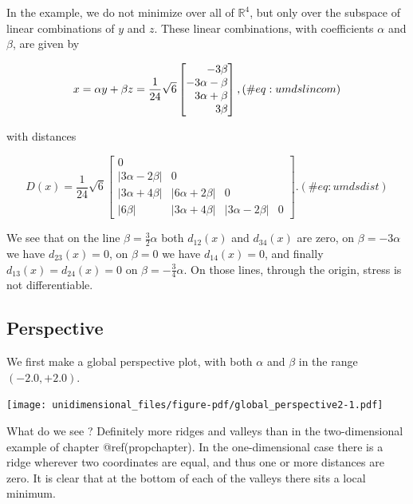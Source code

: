 \documentclass[
  12pt,
  letterpaper,
  DIV=11,
  numbers=noendperiod]{scrreprt}
\theoremstyle{remark}
\begin{document}
In the example, we do not minimize over all of \(\mathbb{R}^4\), but
only over the subspace of linear combinations of \(y\) and \(z\). These
linear combinations, with coefficients \(\alpha\) and \(\beta\), are
given by

\begin{equation}
x=\alpha y+\beta z=\frac{1}{24}\sqrt{6}\begin{bmatrix}\hfill-3\beta\\\hfill-3\alpha-\beta\\
\hfill3\alpha+\beta\\\hfill3\beta\end{bmatrix},
(\#eq:umdslincom)
\end{equation}

with distances

\begin{equation}
D(x)=\frac{1}{24}\sqrt{6}\begin{bmatrix}0&&&\\
|3\alpha-2\beta|&0&&\\
|3\alpha+4\beta|&|6\alpha+2\beta|&0&\\
|6\beta|&|3\alpha+4\beta|&|3\alpha-2\beta|&0
\end{bmatrix}.
(\#eq:umdsdist)
\end{equation}

We see that on the line \(\beta=\frac32\alpha\) both \(d_{12}(x)\) and
\(d_{34}(x)\) are zero, on \(\beta=-3\alpha\) we have \(d_{23}(x)=0\),
on \(\beta=0\) we have \(d_{14}(x)=0\), and finally
\(d_{13}(x)=d_{24}(x)=0\) on \(\beta=-\frac34\alpha\). On those lines,
through the origin, stress is not differentiable.

\subsection{Perspective}\label{perspective}

We first make a global perspective plot, with both \(\alpha\) and
\(\beta\) in the range \((-2.0,+2.0)\).

\begin{center}
\texttt{[image: unidimensional\_files/figure-pdf/global\_perspective2-1.pdf]}
\end{center}

What do we see ? Definitely more ridges and valleys than in the
two-dimensional example of chapter @ref(propchapter). In the
one-dimensional case there is a ridge wherever two coordinates are
equal, and thus one or more distances are zero. It is clear that at the
bottom of each of the valleys there sits a local minimum.
\end{document}
